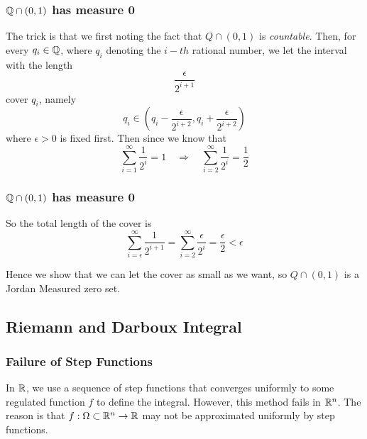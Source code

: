 \documentclass[12pt, t]{beamer}
\renewcommand{\emph}[1]{{\color{Turquoise3}\textsl{#1}}}
\begin{document}
\begin{frame}
    \frametitle{$\mathbb{Q}\cap (0,1)$ has measure 0}
\par The trick is that we first noting the fact that $Q\cap (0,1)$ is 
\emph{countable}. Then, for every $q_i\in\mathbb{Q}$, where $q_i$ denoting the $i-th$ rational number, we let the interval with the length 
\begin{equation*}
    \frac{\epsilon}{2^{i+1}}
\end{equation*}
cover $q_i$, namely 
\begin{equation*}
    q_i \in (q_i - \frac{\epsilon}{2^{i+2}}, q_i + \frac{\epsilon}{2^{i+2}})
\end{equation*}
where $\epsilon > 0$ is fixed first. Then since we know that 
\begin{equation*}
    \sum^\infty_{i = 1}\frac{1}{2^i} = 1\quad\Rightarrow\quad \sum^\infty_{i = 2}\frac{1}{2^i} = \frac{1}{2}
\end{equation*}
\end{frame}


\begin{frame}
    \frametitle{$\mathbb{Q}\cap (0,1)$ has measure 0}

\par So the total length of the cover is 
\begin{equation*}
    \sum^\infty_{i = \epsilon}\frac{1}{2^{i+1}} = \sum^\infty_{i = 2}\frac{\epsilon}{2^i} = \frac{\epsilon}{2}<\epsilon
\end{equation*}

\par Hence we show that we can let the cover as small as we want, so $Q\cap (0,1)$ is a Jordan Measured zero set.

\end{frame}

\subsection{Riemann and Darboux Integral}
\begin{frame}
    \frametitle{Failure of Step Functions }
    In $\mathbb{R}$, we use a sequence of step functions that converges uniformly to some regulated function $f$ to define the integral. However, this method fails in $\mathbb{R}^n$. The reason is that $f:\Omega\subset\mathbb{R}^n\to\mathbb{R}$  may not be approximated uniformly by step functions.
\end{frame}
\end{document}
